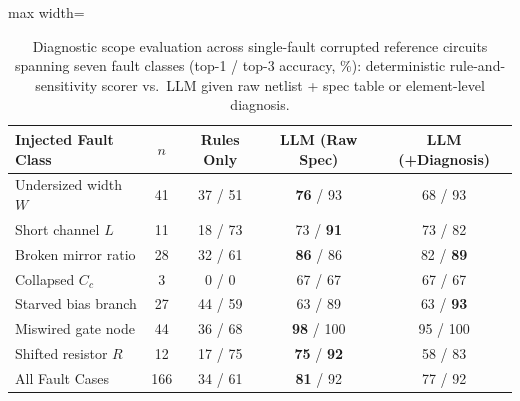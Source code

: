 \begin{table}[t]
\centering
\caption{Diagnostic scope evaluation across \FaultN{} single-fault corrupted reference circuits spanning seven fault classes (top-1 / top-3 accuracy, \%): deterministic rule-and-sensitivity scorer vs.\ LLM given raw netlist + spec table or element-level diagnosis.}
\label{tab:fault}
\scriptsize
\setlength{\tabcolsep}{3.8pt}
\begin{adjustbox}{max width=\columnwidth}
\begin{tabular}{@{}lcccc@{}}
\toprule
Injected Fault Class & $n$ & Rules Only & LLM (Raw Spec) & LLM (+Diagnosis) \\
\midrule
Undersized width $W$ & 41 & 37 / 51 & \textbf{76} / 93 & 68 / 93 \\
Short channel $L$ & 11 & 18 / 73 & 73 / \textbf{91} & 73 / 82 \\
Broken mirror ratio & 28 & 32 / 61 & \textbf{86} / 86 & 82 / \textbf{89} \\
Collapsed $C_c$ & 3 & 0 / 0 & 67 / 67 & 67 / 67 \\
Starved bias branch & 27 & 44 / 59 & 63 / 89 & 63 / \textbf{93} \\
Miswired gate node & 44 & 36 / 68 & \textbf{98} / 100 & 95 / 100 \\
Shifted resistor $R$ & 12 & 17 / 75 & \textbf{75} / \textbf{92} & 58 / 83 \\
\midrule
All Fault Cases & 166 & 34 / 61 & \textbf{81} / 92 & 77 / 92 \\
\bottomrule
\end{tabular}
\end{adjustbox}
\end{table}
